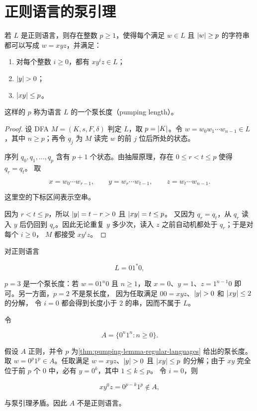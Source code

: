 \lecture
\label{lec:pumping-lemma}

\section{正则语言的泵引理}

\begin{theorem}
  \label{thm:pumping-lemma-regular-languages}
  若 $L$ 是正则语言，则存在整数 $p\geq1$，使得每个满足
  $w\in L$ 且 $\lvert w\rvert\geq p$ 的字符串都可以写成 $w=xyz$，并满足：

  \begin{enumerate}[label=\arabic*.]
    \item 对每个整数 $i\geq0$，都有 $xy^iz\in L$；
    \item $\lvert y\rvert>0$；
    \item $\lvert xy\rvert\leq p$。
  \end{enumerate}

  这样的 $p$ 称为语言 $L$ 的一个泵长度（pumping length）。
\end{theorem}

\begin{proof}
  设 DFA $M=(K,s,F,\delta)$ 判定 $L$，取 $p=\lvert K\rvert$。令
  $w=w_0w_1\cdots w_{n-1}\in L$，其中 $n\geq p$；再令 $q_j$ 为 $M$
  读完 $w$ 的前 $j$ 位后所处的状态。

  序列 $q_0,q_1,\ldots,q_p$ 含有 $p+1$ 个状态。由抽屉原理，存在
  $0\leq r<t\leq p$ 使得 $q_r=q_t$。
  取

  \[
    x=w_0\cdots w_{r-1},\qquad
    y=w_r\cdots w_{t-1},\qquad
    z=w_t\cdots w_{n-1}.
  \]

  这里空的下标区间表示空串。

  因为 $r<t\leq p$，所以 $\lvert y\rvert=t-r>0$ 且 $\lvert xy\rvert=t\leq p$。
  又因为 $q_r=q_t$，从 $q_r$ 读入 $y$ 后仍回到 $q_r$。因此无论重复
  $y$ 多少次，读入 $z$ 之前自动机都处于 $q_r$；于是对每个 $i\geq0$，
  $M$ 都接受 $xy^iz$。
\end{proof}

\begin{example}
  \label{ex:pumping-length-simple-language}
  对正则语言

  \[
    L=01^*0,
  \]

  $p=3$ 是一个泵长度：若 $w=01^n0$ 且 $n\geq1$，取
  $x=0$、$y=1$、$z=1^{n-1}0$ 即可。另一方面，$p=2$ 不是泵长度，
  因为任取满足 $00=xyz$、$\lvert y\rvert>0$ 和 $\lvert xy\rvert\leq2$ 的分解，
  令 $i=0$ 都会得到长度小于 $2$ 的串，因而不属于 $L$。
\end{example}

\begin{example}
  \label{ex:zero-n-one-n-nonregular}
  令

  \[
    A=\{0^n1^n:n\geq0\}.
  \]

  假设 $A$ 正则，并令 $p$ 为\cref{thm:pumping-lemma-regular-languages}
  给出的泵长度。取 $w=0^p1^p\in A$。任取满足
  $w=xyz$、$\lvert y\rvert>0$ 且 $\lvert xy\rvert\leq p$ 的分解；由于 $xy$
  完全位于前 $p$ 个 $0$ 中，必有 $y=0^k$，其中 $1\leq k\leq p$。
  令 $i=0$，则

  \[
    xy^0z=0^{p-k}1^p\notin A,
  \]

  与泵引理矛盾。因此 $A$ 不是正则语言。
\end{example}
